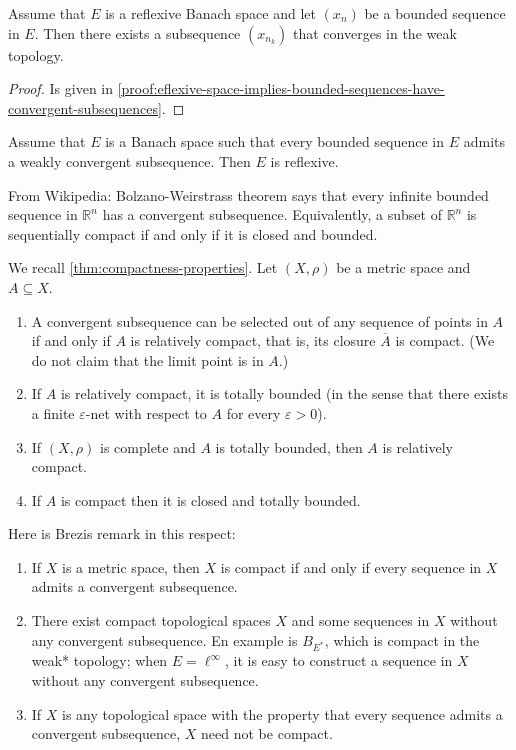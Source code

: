 \documentclass{article}
\theoremstyle{definition}
\numberwithin{equation}{section}
\newcommand{\R}{\mathbb{R}}
\begin{document}
\begin{thm}\label{thm:reflexive-space-implies-bounded-sequences-have-convergent-subsequences}
	Assume that $E$ is a reflexive Banach space and let $(x_n)$ be a bounded sequence in $E$. Then there exists a subsequence $(x_{n_k})$ that converges in the weak topology.
\end{thm}
\begin{proof}
	Is given in \cref{proof:eflexive-space-implies-bounded-sequences-have-convergent-subsequences}.
\end{proof}
\begin{thm}
	Assume that $E$ is a Banach space such that every bounded sequence in $E$ admits a weakly convergent subsequence. Then $E$ is reflexive.
\end{thm}
\begin{remark}
	From Wikipedia: Bolzano-Weirstrass theorem says that every infinite bounded sequence in $\R^n$ has a convergent subsequence. Equivalently, a subset of $\R^n$ is sequentially compact if and only if it is closed and bounded.
\end{remark}
\begin{remark}
	We recall \cref{thm:compactness-properties}. Let $(X,\rho)$ be a metric space and $A\subseteq X$.
	\begin{enumerate}
		\item A convergent subsequence can be selected out of any sequence of points in $A$ if and only if $A$ is relatively compact, that is, its closure $\overline{A}$ is compact. (We do not claim that the limit point is in $A$.)
		\item If $A$ is relatively compact, it is totally bounded (in the sense that there exists a finite $\varepsilon$-net with respect to $A$ for every $\varepsilon>0$).
		\item If $(X,\rho)$ is complete and $A$ is totally bounded, then $A$ is relatively compact. 
		\item If $A$ is compact then it is closed and totally bounded.
	\end{enumerate}
\end{remark}
\begin{remark}Here is Brezis remark in this respect:
	\begin{enumerate}
		\item If $X$ is a metric space, then $X$ is compact if and only if every sequence in $X$ admits a convergent subsequence.
		\item There exist compact topological spaces $X$ and some sequences in $X$ without any convergent subsequence. En example is $B_{E^*}$, which is compact in the weak* topology; when $E=\ell^\infty$, it is easy to construct a sequence in $X$ without any convergent subsequence.
		\item If $X$ is any topological space with the property that every sequence admits a convergent subsequence, $X$ need not be compact.	
	\end{enumerate}
\end{remark}
\end{document}
